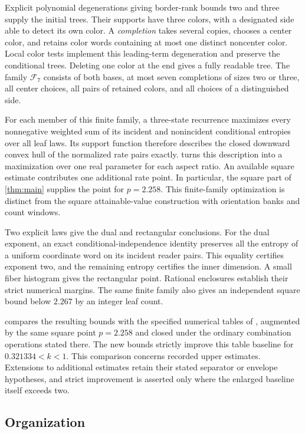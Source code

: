 \documentclass[11pt]{article}
\numberwithin{equation}{section}
\theoremstyle{definition}
\theoremstyle{remark}
\begin{document}
Explicit polynomial degenerations giving border-rank bounds two and
three supply the initial trees.  Their supports have three colors, with a
designated side able to detect its own color.  A \emph{completion}
takes several copies, chooses a center color, and retains color words
containing at most one distinct noncenter color.  Local color tests
implement this leading-term degeneration and preserve the conditional trees.
Deleting one color at the end gives a fully readable tree.
The family \(\mathcal F_7\) consists of both bases, at most seven
completions of sizes two or three, all center choices, all pairs of
retained colors, and all choices of a distinguished side.

For each member of this finite family, a three-state recurrence
maximizes every nonnegative weighted sum of its incident and
nonincident conditional entropies over all leaf laws.  Its support
function therefore describes the closed downward convex hull of the
normalized rate pairs exactly.   turns
this description into a maximization over one real parameter for
each aspect ratio.  An available square estimate contributes one
additional rate point.  In particular, the square part of
\cref{thm:main} supplies the point for \(p=2.258\).
This finite-family optimization is distinct from the square
attainable-value construction with orientation banks and count windows.

Two explicit laws give the dual and rectangular conclusions.
For the dual exponent, an exact conditional-independence identity
preserves all the entropy of a uniform coordinate word on its incident
reader pairs.  This equality certifies exponent two, and the remaining
entropy certifies the inner dimension.  A small fiber histogram gives
the rectangular point.  Rational enclosures establish their strict
numerical margins.  The same finite family also gives an independent
square bound below \(2.267\) by an integer leaf count.

 compares the resulting bounds with the
specified numerical tables of \cite{vxxz,advxxz}, augmented by the
same square point \(p=2.258\) and closed under the ordinary
combination operations stated there.  The new bounds strictly improve
this table baseline for \(0.321334<k<1\).  This comparison concerns
recorded upper estimates.  Extensions to additional estimates retain
their stated separator or envelope hypotheses, and strict improvement
is asserted only where the enlarged baseline itself exceeds two.

\subsection{Organization}
\end{document}
